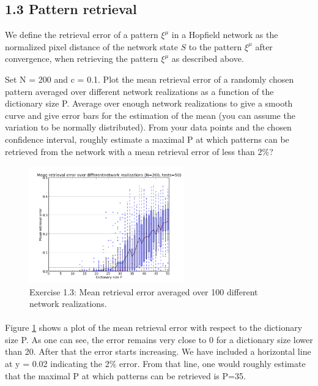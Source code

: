 \subsection{1.3 Pattern retrieval}

\begin{itshape}
\small
We define the retrieval error of a pattern $\xi^\mu$ in a Hopfield network as the normalized pixel distance of the network state $S$ to the pattern $\xi^\mu$ after convergence, when retrieving the pattern $\xi^\mu$ as described above.

Set N = 200 and c = 0.1. Plot the mean retrieval error of a randomly chosen pattern averaged over different network realizations as a function of the dictionary size P. Average over enough network realizations to give a smooth curve and give error bars for the estimation of the mean (you can assume the variation to be normally distributed). From your data points and the chosen confidence interval, roughly estimate a maximal P at which patterns can be retrieved from the network with a mean retrieval error of less than 2$\%$?

\end{itshape}

\begin{figure}
  \vspace{-20pt}
  \begin{center}
    \includegraphics[width=0.6\textwidth]{dat/ex1_3-error_avg-N200-P50-Q50.png}
  \end{center}
  \vspace{-20pt}
  \caption{Exercise 1.3: Mean retrieval error averaged over 100 different network realizations.}
  \label{fig: Question 1.3}
  \vspace{-10pt}
\end{figure}

\paragraph*{}

Figure \ref{fig: Question 1.3} shows a plot of the mean retrieval error with respect to the dictionary size P. As one can see, the error remains very close to 0 for a dictionary size lower than 20. After that the error starts increasing. We have included a horizontal line at y = 0.02 indicating the 2$\%$ error. From that line, one would roughly estimate that the maximal P at which patterns can be retrieved is P=35. 

